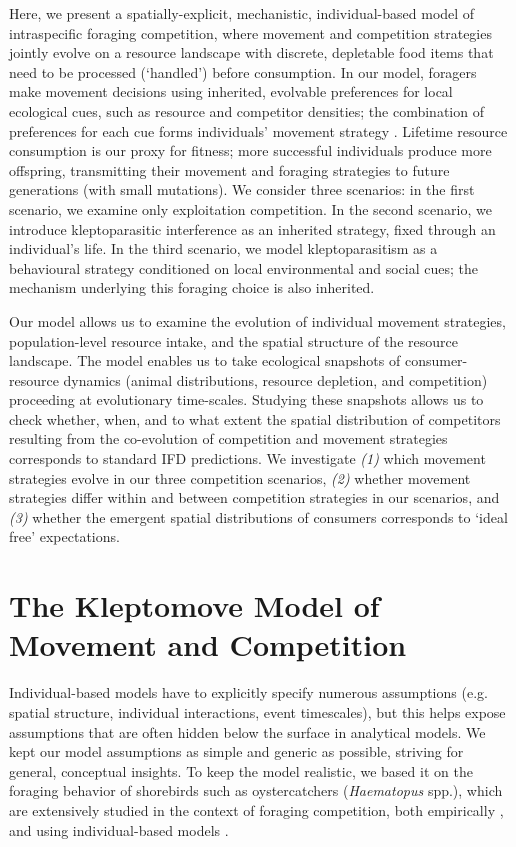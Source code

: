 Here, we present a spatially-explicit, mechanistic, individual-based model of intraspecific foraging competition, where movement and competition strategies jointly evolve on a resource landscape with discrete, depletable food items that need to be processed (`handled') before consumption.
In our model, foragers make movement decisions using inherited, evolvable preferences for local ecological cues, such as resource and competitor densities; the combination of preferences for each cue forms individuals' movement strategy \parencite[similar to relative step-selection:][]{fortin2005, avgar2016}.
Lifetime resource consumption is our proxy for fitness; more successful individuals produce more offspring, transmitting their movement and foraging strategies to future generations (with small mutations).
We consider three scenarios: in the first scenario, we examine only exploitation competition.
In the second scenario, we introduce kleptoparasitic interference as an inherited strategy, fixed through an individual's life.
In the third scenario, we model kleptoparasitism as a behavioural strategy conditioned on local environmental and social cues; the mechanism underlying this foraging choice is also inherited.

Our model allows us to examine the evolution of individual movement strategies, population-level resource intake, and the spatial structure of the resource landscape.
The model enables us to take ecological snapshots of consumer-resource dynamics (animal distributions, resource depletion, and competition) proceeding at evolutionary time-scales.
Studying these snapshots allows us to check whether, when, and to what extent the spatial distribution of competitors resulting from the co-evolution of competition and movement strategies corresponds to standard IFD predictions.
We investigate \textit{(1)} which movement strategies evolve in our three competition scenarios, \textit{(2)} whether movement strategies differ within and between competition strategies in our scenarios, and \textit{(3)} whether the emergent spatial distributions of consumers corresponds to `ideal free' expectations.

\section*{The Kleptomove Model of Movement and Competition}

Individual-based models have to explicitly specify numerous assumptions (e.g. spatial structure, individual interactions, event timescales), but this helps expose assumptions that are often hidden below the surface in analytical models. 
We kept our model assumptions as simple and generic as possible, striving for general, conceptual insights.
To keep the model realistic, we based it on the foraging behavior of shorebirds such as oystercatchers (\textit{Haematopus} spp.), which are extensively studied in the context of foraging competition, both empirically \parencite[e.g.][]{vahl2005, vahl2005a,vahl2007a, rutten2010, rutten2010a}, and using individual-based models \parencite[reviewed in][]{stillman2010}.

